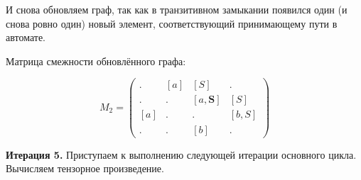 \begin{example}
И снова обновляем граф, так как в транзитивном замыкании появился один (и снова ровно один) новый элемент, соответствующий принимающему пути в автомате.
\begin{pic}
\begin{center}
\end{center}
\end{pic}

Матрица смежности обновлённого графа:

$$ M_2 =
\begin{pmatrix} 
. & [a] & [S] & . \\
. & . & [a, \textbf{S}] & [S] \\
[a] & . & . & [b,S] \\
. & . & [b] & . 
\end{pmatrix}
$$

\textbf{Итерация 5.}
Приступаем к выполнению следующей итерации основного цикла.
Вычисляем тензорное произведение.



\end{example}
